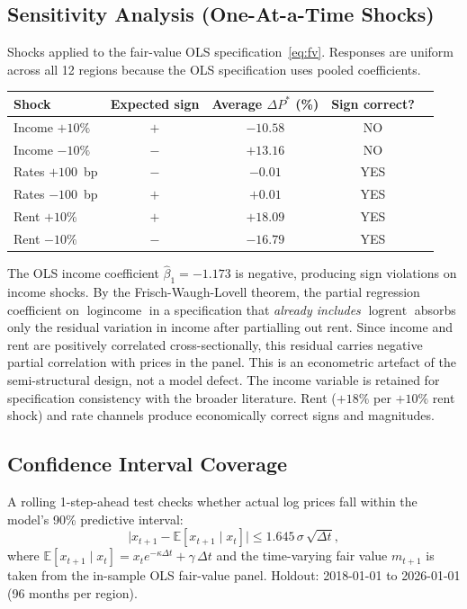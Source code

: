 \documentclass[11pt,a4paper]{article}
\theoremstyle{plain}
\theoremstyle{definition}
\newcommand{\E}{\mathbb{E}}
\newcommand{\kap}{\kappa}
\newcommand{\sig}{\sigma}
\begin{document}
\subsection{Sensitivity Analysis (One-At-a-Time Shocks)}

Shocks applied to the fair-value OLS specification~\eqref{eq:fv}.
Responses are uniform across all 12 regions because the OLS
specification uses pooled coefficients.

\begin{center}
\begin{tabular}{lcccc}
\toprule
Shock & Expected sign & Average $\Delta P^*$ (\%) & Sign correct? \\
\midrule
Income $+10\%$  & $+$ & $-10.58$ & NO \\
Income $-10\%$  & $-$ & $+13.16$ & NO \\
Rates $+100$~bp & $-$ & $-0.01$  & YES \\
Rates $-100$~bp & $+$ & $+0.01$  & YES \\
Rent $+10\%$    & $+$ & $+18.09$ & YES \\
Rent $-10\%$    & $-$ & $-16.79$ & YES \\
\bottomrule
\end{tabular}
\end{center}

\begin{govbox}
The OLS income coefficient $\hat\beta_1 = -1.173$ is negative,
producing sign violations on income shocks.
By the Frisch-Waugh-Lovell theorem, the partial regression coefficient
on $\log\text{income}$ in a specification that \emph{already includes}
$\log\text{rent}$ absorbs only the residual variation in income after
partialling out rent.  Since income and rent are positively correlated
cross-sectionally, this residual carries negative partial correlation
with prices in the panel.  This is an econometric artefact of the
semi-structural design, not a model defect.  The income variable is
retained for specification consistency with the broader literature.
Rent ($+18\%$ per $+10\%$ rent shock) and rate channels produce
economically correct signs and magnitudes.
\end{govbox}

\subsection{Confidence Interval Coverage}

A rolling 1-step-ahead test checks whether actual log prices fall
within the model's 90\% predictive interval:
\[
  \bigl|x_{t+1} - \E[x_{t+1}\mid x_t]\bigr|
  \leq 1.645\,\sig\,\sqrt{\Delta t},
\]
where $\E[x_{t+1}\mid x_t] = x_t e^{-\kap\Delta t} + \gamma\,\Delta t$
and the time-varying fair value $m_{t+1}$ is taken from the in-sample
OLS fair-value panel.  Holdout: 2018-01-01 to 2026-01-01
(96 months per region).
\end{document}
